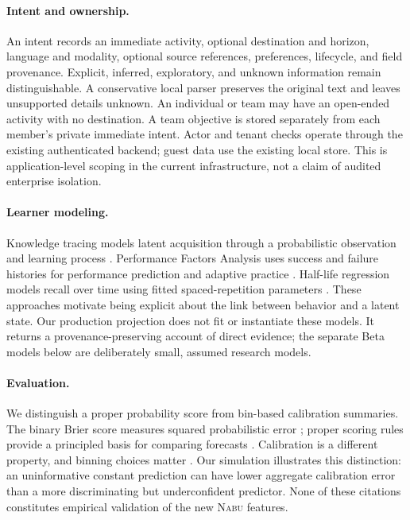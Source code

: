 \documentclass{article}
\newcommand{\Nabu}{\textsc{Nabu}}
\begin{document}
\paragraph{Intent and ownership.}
An intent records an immediate activity, optional destination and horizon, language and modality, optional source references, preferences, lifecycle, and field provenance. Explicit, inferred, exploratory, and unknown information remain distinguishable. A conservative local parser preserves the original text and leaves unsupported details unknown. An individual or team may have an open-ended activity with no destination. A team objective is stored separately from each member's private immediate intent. Actor and tenant checks operate through the existing authenticated backend; guest data use the existing local store. This is application-level scoping in the current infrastructure, not a claim of audited enterprise isolation.

\paragraph{Learner modeling.}
Knowledge tracing models latent acquisition through a probabilistic observation and learning process \citep{corbett1994knowledge}. Performance Factors Analysis uses success and failure histories for performance prediction and adaptive practice \citep{pavlik2009performance}. Half-life regression models recall over time using fitted spaced-repetition parameters \citep{settles2016trainable}. These approaches motivate being explicit about the link between behavior and a latent state. Our production projection does not fit or instantiate these models. It returns a provenance-preserving account of direct evidence; the separate Beta models below are deliberately small, assumed research models.

\paragraph{Evaluation.}
We distinguish a proper probability score from bin-based calibration summaries. The binary Brier score measures squared probabilistic error \citep{brier1950verification}; proper scoring rules provide a principled basis for comparing forecasts \citep{gneiting2007proper}. Calibration is a different property, and binning choices matter \citep{guo2017calibration}. Our simulation illustrates this distinction: an uninformative constant prediction can have lower aggregate calibration error than a more discriminating but underconfident predictor. None of these citations constitutes empirical validation of the new \Nabu{} features.
\end{document}
